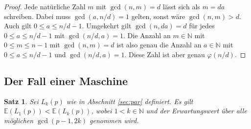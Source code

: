 \documentclass[a4paper, 10pt, ngerman]{article}
\newcommand{\E}{\mathbb{E}}
\newcommand{\N}{\mathbb{N}}
\newtheorem{theorem}{Satz}
\begin{document}
\begin{proof}
    Jede natürliche Zahl $m$ mit $\gcd(n, m) = d$ lässt sich als $m = da$ schreiben. Dabei muss $\gcd(a, n / d) = 1$ gelten, sonst wäre $\gcd(n, m) > d$. Auch gilt $0 \le a \le n/d - 1$. Umgekehrt gilt $\gcd(n, da) = d$ für jedes $0 \le a \le n/d - 1$ mit $\gcd(n/d, a) = 1$. Die Anzahl an $m \in \N$ mit $0 \le m \le n - 1$ mit $\gcd(n, m) = d$ ist also genau die Anzahl an $a \in \N$ mit $0 \le a \le  n / d - 1$ und $\gcd(n / d, a) = 1$. Diese Zahl ist aber genau $\varphi(n/d)$.
\end{proof}

\subsection{Der Fall einer Maschine}

\begin{theorem}
    Sei $L_k(p)$ wie in Abschnitt \ref{sec:par} definiert. Es gilt $\E(L_1(p)) < \E(L_k(p))$, wobei $1 < k \in \N$ und der Erwartungswert über alle möglichen $\gcd(p - 1, 2k)$ genommen wird.
\end{theorem}
\end{document}
